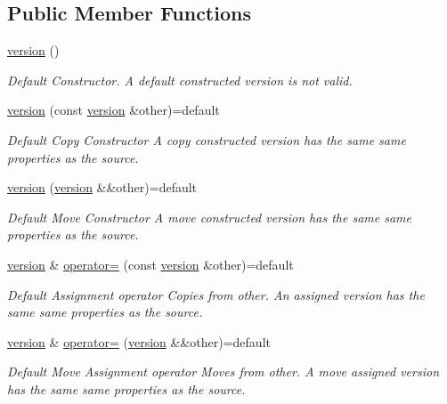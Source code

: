 \subsection*{Public Member Functions}
\begin{DoxyCompactItemize}
\item 
\hypertarget{classarchived_1_1version_a75950e89fdd7d100d9bb9c52be9750e5}{}\hyperlink{classarchived_1_1version_a75950e89fdd7d100d9bb9c52be9750e5}{version} ()\label{classarchived_1_1version_a75950e89fdd7d100d9bb9c52be9750e5}

\begin{DoxyCompactList}\small\item\em Default Constructor. A default constructed version is not valid. \end{DoxyCompactList}\item 
\hyperlink{classarchived_1_1version_ac511988e424b10abf26638b9aeb49934}{version} (const \hyperlink{classarchived_1_1version}{version} \&other)=default
\begin{DoxyCompactList}\small\item\em Default Copy Constructor A copy constructed version has the same same properties as the source. \end{DoxyCompactList}\item 
\hyperlink{classarchived_1_1version_a554be7a467115e99c8f2b6ea4aa8ea2d}{version} (\hyperlink{classarchived_1_1version}{version} \&\&other)=default
\begin{DoxyCompactList}\small\item\em Default Move Constructor A move constructed version has the same same properties as the source. \end{DoxyCompactList}\item 
\hyperlink{classarchived_1_1version}{version} \& \hyperlink{classarchived_1_1version_aa808a277ce1c999ac7472aaa1d77a7e3}{operator=} (const \hyperlink{classarchived_1_1version}{version} \&other)=default
\begin{DoxyCompactList}\small\item\em Default Assignment operator Copies from other. An assigned version has the same same properties as the source. \end{DoxyCompactList}\item 
\hyperlink{classarchived_1_1version}{version} \& \hyperlink{classarchived_1_1version_a8f5347b0b1207478ac2ec6219e5c315d}{operator=} (\hyperlink{classarchived_1_1version}{version} \&\&other)=default
\begin{DoxyCompactList}\small\item\em Default Move Assignment operator Moves from other. A move assigned version has the same same properties as the source. \end{DoxyCompactList}\end{DoxyCompactItemize}


